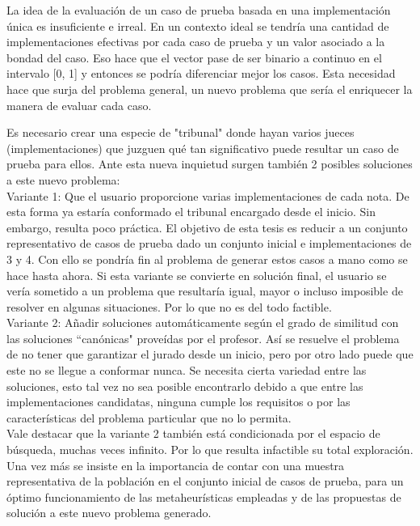 \documentclass[a4paper,12pt]{book}
\begin{document}
	La idea de la evaluación de un caso de prueba basada en una implementación única es insuficiente e irreal. En un contexto ideal se tendría una cantidad de implementaciones efectivas por cada caso de prueba y un valor asociado a la bondad del caso. Eso hace que el vector pase de ser binario a continuo en el intervalo [0, 1] y entonces se podría diferenciar mejor los casos. Esta necesidad hace que surja del problema general, un nuevo problema que sería el enriquecer la manera de evaluar cada caso.
	
	Es necesario crear una especie de "tribunal" donde hayan varios jueces (implementaciones) que juzguen qué tan significativo puede resultar un caso de prueba para ellos. Ante esta nueva inquietud surgen también 2 posibles soluciones a este nuevo problema: \\
	
 	Variante 1: Que el usuario proporcione varias implementaciones de cada nota. De esta forma ya estaría conformado el tribunal encargado desde el inicio. Sin embargo, resulta poco práctica. El objetivo de esta tesis es reducir a un conjunto representativo de casos de prueba dado un conjunto inicial e implementaciones de 3 y 4. Con ello se pondría fin al problema de generar estos casos a mano como se hace hasta ahora. Si esta variante se convierte en solución final, el usuario se vería sometido a un problema que resultaría igual, mayor o incluso imposible de resolver en algunas situaciones. Por lo que no es del todo factible. \\
	
	Variante 2: Añadir soluciones automáticamente según el grado de similitud con las soluciones ``canónicas" proveídas por el profesor. Así se resuelve el problema de no tener que garantizar el jurado desde un inicio, pero por otro lado puede que este no se llegue a conformar nunca. Se necesita cierta variedad entre las soluciones, esto tal vez no sea posible encontrarlo debido a que entre las implementaciones candidatas, ninguna cumple los requisitos o por las características del problema particular que no lo permita. \\
	
	Vale destacar que la variante 2 también está condicionada por el espacio de búsqueda, muchas veces infinito. Por lo que resulta infactible su total exploración. Una vez más se insiste en la importancia de contar con una muestra representativa de la población en el conjunto inicial de casos de prueba, para un óptimo funcionamiento de las metaheurísticas empleadas y de las propuestas de solución a este nuevo problema generado. \\
	
\end{document}
